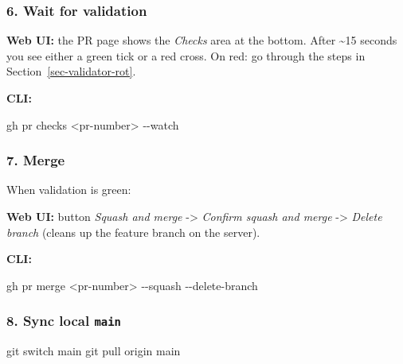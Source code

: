 \documentclass[
  english,
  letterpaper,
]{scrbook}
\newenvironment{Shaded}{\begin{snugshade}}{\end{snugshade}}
\newcommand{\AttributeTok}[1]{\textcolor[rgb]{0.40,0.45,0.13}{#1}}
\newcommand{\ExtensionTok}[1]{\textcolor[rgb]{0.00,0.23,0.31}{#1}}
\newcommand{\FunctionTok}[1]{\textcolor[rgb]{0.28,0.35,0.67}{#1}}
\newcommand{\NormalTok}[1]{\textcolor[rgb]{0.00,0.23,0.31}{#1}}
\newcommand{\OperatorTok}[1]{\textcolor[rgb]{0.37,0.37,0.37}{#1}}
\begin{document}
\subsubsection{6. Wait for validation}\label{wait-for-validation}

\textbf{Web UI:} the PR page shows the \emph{Checks} area at the bottom.
After \textasciitilde15 seconds you see either a green tick or a red
cross. On red: go through the steps in Section~\ref{sec-validator-rot}.

\textbf{CLI:}

\begin{Shaded}
\begin{Highlighting}[]
\ExtensionTok{gh}\NormalTok{ pr checks }\OperatorTok{\textless{}}\NormalTok{pr{-}number}\OperatorTok{\textgreater{}}\NormalTok{ {-}{-}watch}
\end{Highlighting}
\end{Shaded}

\subsubsection{7. Merge}\label{merge}

When validation is green:

\textbf{Web UI:} button \emph{Squash and merge} -\textgreater{}
\emph{Confirm squash and merge} -\textgreater{} \emph{Delete branch}
(cleans up the feature branch on the server).

\textbf{CLI:}

\begin{Shaded}
\begin{Highlighting}[]
\ExtensionTok{gh}\NormalTok{ pr merge }\OperatorTok{\textless{}}\NormalTok{pr{-}number}\OperatorTok{\textgreater{}}\NormalTok{ {-}{-}squash }\AttributeTok{{-}{-}delete{-}branch}
\end{Highlighting}
\end{Shaded}

\subsubsection{\texorpdfstring{8. Sync local
\texttt{main}}{8. Sync local main}}\label{sync-local-main}

\begin{Shaded}
\begin{Highlighting}[]
\FunctionTok{git}\NormalTok{ switch main}
\FunctionTok{git}\NormalTok{ pull origin main}
\end{Highlighting}
\end{Shaded}
\end{document}

